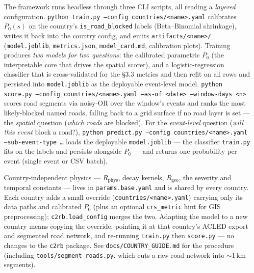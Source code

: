 \documentclass[11pt,a4paper]{article}
\newcommand{\code}[1]{\texttt{\small #1}}
\newcommand{\Rphys}{R_{\mathrm{phys}}}
\newcommand{\Rgeo}{R_{\mathrm{geo}}}
\begin{document}
The framework runs headless through three CLI scripts, all reading a \emph{layered} configuration.
\code{python train.py --config countries/<name>.yaml} calibrates $P_0(s)$ on the country's
\code{is\_road\_blocked} labels (Beta--Binomial shrinkage), writes it back into the country config,
and emits \code{artifacts/<name>/} (\code{model.joblib}, \code{metrics.json}, \code{model\_card.md},
calibration plots). Training produces \emph{two models for two questions}: the calibrated
parametric $P_0$ (the interpretable core that drives the spatial scorer), and a logistic-regression
classifier that is cross-validated for the \S3.3 metrics and then refit on all rows and persisted
into \code{model.joblib} as the deployable event-level model.
\code{python score.py --config countries/<name>.yaml --as-of <date> --window-days <n>}
scores road segments via noisy-OR over the window's events and ranks the most likely-blocked named
roads, falling back to a grid surface if no road layer is set --- the \emph{spatial} question
(\emph{which roads} are blocked). For the \emph{event-level} question (\emph{will this event} block
a road?), \code{python predict.py --config countries/<name>.yaml --sub-event-type \ldots} loads the
deployable \code{model.joblib} --- the classifier \code{train.py} fits on the labels and persists
alongside $P_0$ --- and returns one probability per event (single event or CSV batch).

Country-independent physics --- $\Rphys$, decay kernels, $\Rgeo$, the severity and temporal
constants --- lives in \code{params.base.yaml} and is shared by every country. Each country adds a
small override (\code{countries/<name>.yaml}) carrying only its data paths and calibrated $P_0$
(plus an optional \code{crs\_metric} hint for GIS preprocessing); \code{c2rb.load\_config} merges
the two. Adapting the model to a new country means copying the override, pointing it at that
country's ACLED export and segmented road network, and re-running \code{train.py} then
\code{score.py} --- no changes to the \code{c2rb} package. See \code{docs/COUNTRY\_GUIDE.md} for
the procedure (including \code{tools/segment\_roads.py}, which cuts a raw road network into
$\sim$1\,km segments).
\end{document}
